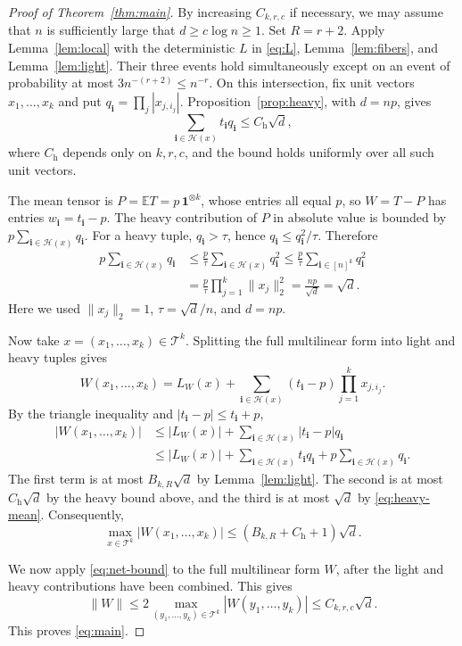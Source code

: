 \documentclass[10pt,a4paper]{amsart}
\numberwithin{equation}{section}
\newcommand{\E}{\mathbb E}
\newcommand{\one}{\mathbf 1}
\begin{document}
\begin{proof}[Proof of Theorem~\ref{thm:main}]
By increasing $C_{k,r,c}$ if necessary,
we may assume that $n$ is sufficiently large that
$d\ge c\log n\ge1$. Set $R=r+2$.
Apply Lemma~\ref{lem:local} with the deterministic $L$ in
\eqref{eq:L}, Lemma~\ref{lem:fibers}, and Lemma~\ref{lem:light}.
Their three events hold simultaneously except on an event of
probability at most
$3n^{-(r+2)}\le n^{-r}$.
On this intersection, fix unit vectors $x_1,\ldots,x_k$ and put
$q_{\mathbf i}=\prod_j|x_{j,i_j}|$.
Proposition~\ref{prop:heavy}, with $d=np$, gives
\[
 \sum_{\mathbf i\in\mathcal H(x)}t_{\mathbf i}q_{\mathbf i}
 \le C_{\mathrm h}\sqrt d,
\]
where $C_{\mathrm h}$ depends only on $k,r,c$, and the bound holds
uniformly over all such unit vectors.

The mean tensor is $P=\E T=p\,\one^{\otimes k}$, whose entries all
equal $p$, so $W=T-P$ has entries $w_{\mathbf i}=t_{\mathbf i}-p$.
The heavy contribution of $P$ in absolute value is bounded by
$p\sum_{\mathbf i\in\mathcal H(x)}q_{\mathbf i}$.
For a heavy tuple, $q_{\mathbf i}>\tau$, hence
$q_{\mathbf i}\le q_{\mathbf i}^2/\tau$. Therefore
\begin{equation}\label{eq:heavy-mean}
\begin{aligned}
 p\sum_{\mathbf i\in\mathcal H(x)}q_{\mathbf i}
 &\le\frac p\tau\sum_{\mathbf i\in\mathcal H(x)}q_{\mathbf i}^2
 \le\frac p\tau\sum_{\mathbf i\in[n]^k}q_{\mathbf i}^2\\
 &=\frac p\tau\prod_{j=1}^k\|x_j\|_2^2
 =\frac{np}{\sqrt d}=\sqrt d.
\end{aligned}
\end{equation}
Here we used $\|x_j\|_2=1$, $\tau=\sqrt d/n$, and $d=np$.

Now take $x=(x_1,\ldots,x_k)\in\mathcal T^k$.
Splitting the full multilinear form into light and heavy tuples gives
\[
 W(x_1,\ldots,x_k)
 =L_W(x)+\sum_{\mathbf i\in\mathcal H(x)}
                 (t_{\mathbf i}-p)\prod_{j=1}^k x_{j,i_j}.
\]
By the triangle inequality and $|t_{\mathbf i}-p|\le t_{\mathbf i}+p$,
\begin{align*}
 |W(x_1,\ldots,x_k)|
 &\le |L_W(x)|+\sum_{\mathbf i\in\mathcal H(x)}|t_{\mathbf i}-p|q_{\mathbf i}\\
 &\le |L_W(x)|
       +\sum_{\mathbf i\in\mathcal H(x)}t_{\mathbf i}q_{\mathbf i}
       +p\sum_{\mathbf i\in\mathcal H(x)}q_{\mathbf i}.
\end{align*}
The first term is at most $B_{k,R}\sqrt d$ by Lemma~\ref{lem:light}.
The second is at most $C_{\mathrm h}\sqrt d$ by the heavy bound above,
and the third is at most $\sqrt d$ by \eqref{eq:heavy-mean}. Consequently,
\[
 \max_{x\in\mathcal T^k}|W(x_1,\ldots,x_k)|
 \le (B_{k,R}+C_{\mathrm h}+1)\sqrt d.
\]

We now apply \eqref{eq:net-bound} to the full multilinear form $W$,
after the light and heavy contributions have been combined. This gives
\[
 \|W\|\le
       2\max_{(y_1,\ldots,y_k)\in\mathcal T^k}
            |W(y_1,\ldots,y_k)|\le C_{k,r,c}\sqrt d.
\]
This proves \eqref{eq:main}.
\end{proof}
\end{document}
